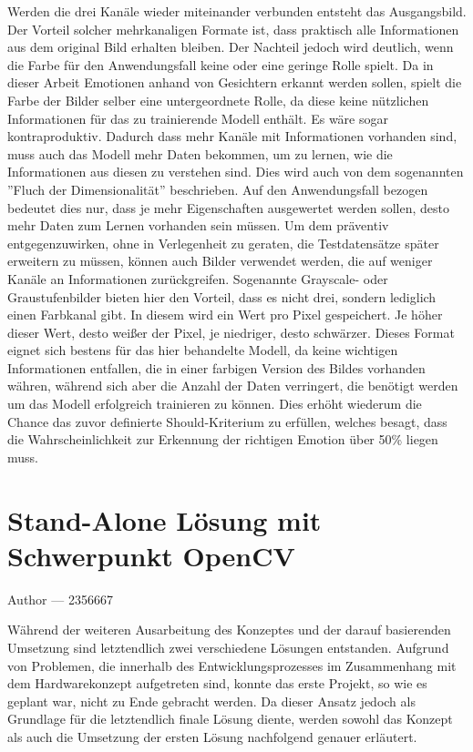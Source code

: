 \documentclass[12pt, a4paper]{report}
\makeatletter
\newcommand{\chapterauthor}[1]{%
  {\parindent0pt\vspace*{-25pt}%
  \large{Author --- }
  \linespread{1.1}\large\scshape#1%
  \par\nobreak\vspace*{35pt} }
  \@afterheading%
}
\makeatother
\begin{document}
Werden die drei Kanäle wieder miteinander verbunden entsteht das Ausgangsbild. Der Vorteil solcher mehrkanaligen Formate ist, dass praktisch alle Informationen aus dem original Bild erhalten bleiben. Der Nachteil jedoch wird deutlich, wenn die Farbe für den Anwendungsfall keine oder eine geringe Rolle spielt. Da in dieser Arbeit Emotionen anhand von Gesichtern erkannt werden sollen, spielt die Farbe der Bilder selber eine untergeordnete Rolle, da diese keine nützlichen Informationen für das zu trainierende Modell enthält. Es wäre sogar kontraproduktiv. Dadurch dass mehr Kanäle mit Informationen vorhanden sind, muss auch das Modell mehr Daten bekommen, um zu lernen, wie die Informationen aus diesen zu verstehen sind. Dies wird auch von dem sogenannten ''Fluch der Dimensionalität'' beschrieben. Auf den Anwendungsfall bezogen bedeutet dies nur, dass je mehr Eigenschaften ausgewertet werden sollen, desto mehr Daten zum Lernen vorhanden sein müssen. Um dem präventiv entgegenzuwirken, ohne in Verlegenheit zu geraten, die Testdatensätze später erweitern zu müssen, können auch Bilder verwendet werden, die auf weniger Kanäle an Informationen zurückgreifen. Sogenannte Grayscale- oder Graustufenbilder bieten hier den Vorteil, dass es nicht drei, sondern lediglich einen Farbkanal gibt. In diesem wird ein Wert pro Pixel gespeichert. Je höher dieser Wert, desto weißer der Pixel, je niedriger, desto schwärzer. Dieses Format eignet sich bestens für das hier behandelte Modell, da keine wichtigen Informationen entfallen, die in einer farbigen Version des Bildes vorhanden währen, während sich aber die Anzahl der Daten verringert, die benötigt werden um das Modell erfolgreich trainieren zu können. Dies erhöht wiederum die Chance das zuvor definierte Should-Kriterium zu erfüllen, welches besagt, dass die Wahrscheinlichkeit zur Erkennung der richtigen Emotion über 50\% liegen muss. 
\chapter{Stand-Alone Lösung mit Schwerpunkt OpenCV}
\chapterauthor{2356667}
Während der weiteren Ausarbeitung des Konzeptes und der darauf basierenden Umsetzung sind letztendlich zwei verschiedene Lösungen entstanden. Aufgrund von Problemen, die innerhalb des Entwicklungsprozesses im Zusammenhang mit dem Hardwarekonzept aufgetreten sind, konnte das erste Projekt, so wie es geplant war, nicht zu Ende gebracht werden. Da dieser Ansatz jedoch als Grundlage für die letztendlich finale Lösung diente, werden sowohl das Konzept als auch die Umsetzung der ersten Lösung nachfolgend genauer erläutert.
\end{document}
